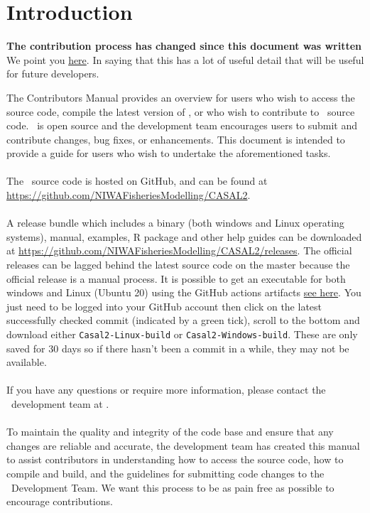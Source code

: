 \section{Introduction\label{sec:Introduction}}
\textbf{The contribution process has changed since this document was written} We point you \href{https://casal2.github.io/contributing/}{here}. In saying that this has a lot of useful detail that will be useful for future developers.


The Contributors Manual provides an overview for users who wish to access the source code, compile the latest version of \CNAME , or who wish to contribute to \CNAME\ source code. \CNAME\ is open source and the development team encourages users to submit and contribute changes, bug fixes, or enhancements. This document is intended to provide a guide for users who wish to undertake the aforementioned tasks. 
\\\\
The \CNAME\ source code is hosted on GitHub, and can be found at \url{https://github.com/NIWAFisheriesModelling/CASAL2}.
\\\\
A release bundle which includes a binary (both windows and Linux operating systems), manual, examples, R package and other help guides can be downloaded at \url{https://github.com/NIWAFisheriesModelling/CASAL2/releases}. The official releases can be lagged behind the latest source code on the master because the official release is a manual process. It is possible to get an executable for both windows and Linux (Ubuntu 20) using the GitHub actions artifacts \href{https://github.com/NIWAFisheriesModelling/CASAL2/actions}{see here}. You just need to be logged into your GitHub account then click on the latest successfully checked commit (indicated by a green tick), scroll to the bottom and download either \texttt{Casal2-Linux-build} or \texttt{Casal2-Windows-build}. These are only saved for 30 days so if there hasn't been a commit in a while, they may not be available.
\\\\
If you have any questions or require more information, please contact the \CNAME\ development team at \email.
\\\\
To maintain the quality and integrity of the code base and ensure that any changes are reliable and accurate, the development team has created this manual to assist contributors in understanding how to access the source code, how to compile and build, and the guidelines for submitting code changes to the \CNAME\ Development Team. We want this process to be as pain free as possible to encourage contributions. 

